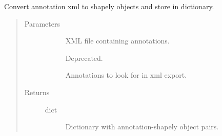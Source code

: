 \documentclass[letterpaper,10pt,english]{sphinxmanual}
\begin{document}
\begin{fulllineitems}
\label{\detokenize{index:pathflowai.utils.create_sparse_annotation_arrays}}
Convert annotation xml to shapely objects and store in dictionary.
\begin{quote}\begin{description}
\item[{Parameters}] \leavevmode\begin{description}
\item[{}] \leavevmode
XML file containing annotations.

\item[{}] \leavevmode
Deprecated.

\item[{}] \leavevmode
Annotations to look for in xml export.

\end{description}

\item[{Returns}] \leavevmode\begin{description}
\item[{dict}] \leavevmode
Dictionary with annotation-shapely object pairs.

\end{description}

\end{description}\end{quote}

\end{fulllineitems}

\end{document}
